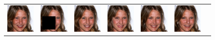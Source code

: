 \begin{figure}
\begin{center}
\begin{tabular}{ccccccc}
        \includegraphics[width=.145\textwidth]{Chapter2/samples/extended_results/inpainting/68/x.png} &   
        \includegraphics[width=.145\textwidth]{Chapter2/samples/extended_results/inpainting/68/y.png} &
        \includegraphics[width=.145\textwidth]{Chapter2/samples/extended_results/inpainting/68/CDE.png} & 
        \includegraphics[width=.145\textwidth]{Chapter2/samples/extended_results/inpainting/68/CDiffE.png} &
        \includegraphics[width=.145\textwidth]{Chapter2/samples/extended_results/inpainting/68/cmde.png} &
        \includegraphics[width=.145\textwidth]{Chapter2/samples/extended_results/inpainting/68/VS-CMDE.png}\\
        

\end{tabular}
\end{center}
\end{figure}

